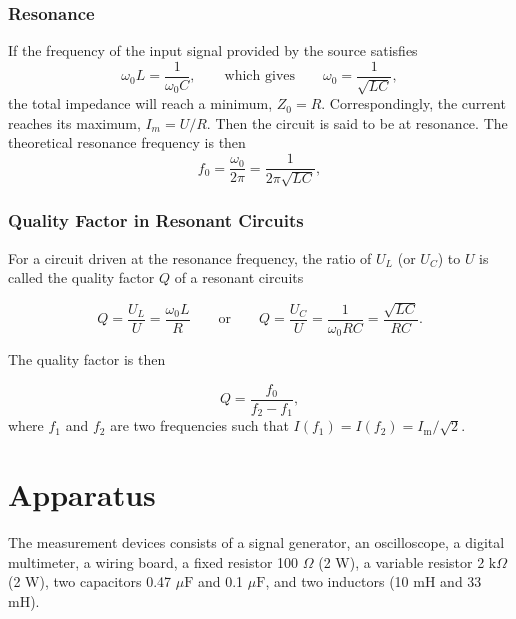 \documentclass{article}
\begin{document}
\subsubsection{Resonance}

If the frequency of the input signal provided by the source satisfies
$$\omega_0 L = \frac{1}{\omega_0 C}, \hspace{2em} \text{which gives} \hspace{2em} \omega_0 = \frac{1}{\sqrt{LC}},$$
the total impedance will reach a minimum, $Z_0 = R$. Correspondingly, the current reaches its maximum, $I_m = U/R$. Then the circuit is said to be at resonance. The theoretical resonance frequency is then 
\begin{equation}
    f_0 = \frac{\omega_0}{2\pi} = \frac{1}{2\pi\sqrt{LC}},
    \label{eq:fres}
\end{equation}

\subsubsection{Quality Factor in Resonant Circuits}

For a circuit driven at the resonance frequency, the ratio of $U_L$ (or $U_C$) to $U$ is called the quality factor $Q$ of a resonant circuits

\begin{equation}
    Q = \frac{U_L}{U} = \frac{\omega_0 L}{R} \hspace{2em} \text{or} \hspace{2em} Q = \frac{U_C}{U} = \frac{1}{\omega_0 RC} =  \frac{\sqrt{LC}}{RC}.
    \label{eq:Qtheo}
\end{equation}

The quality factor is then

\begin{equation}
    Q = \frac{f_0}{f_2 - f_1},
    \label{eq:Qex}
\end{equation}
where $f_1$ and $f_2$ are two frequencies such that $I(f_1) = I(f_2) = I_\text{m}/\sqrt{2}$.



\section{Apparatus}

The measurement devices consists of a signal generator, an oscilloscope, a digital multimeter, a wiring board, a fixed resistor 100 $\Omega$ (2 W), a variable resistor 2 $\text{k}\Omega$ (2 W), two capacitors 0.47 $\mu \text{F}$ and 0.1 $\mu\text{F}$, and two inductors (10 mH and 33 mH).
\end{document}
